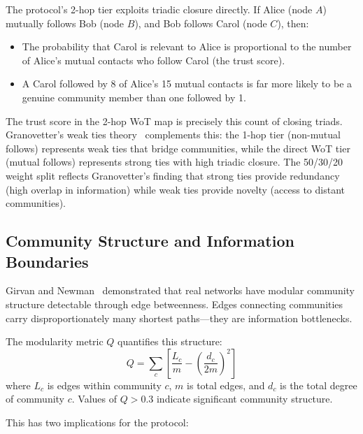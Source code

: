 \documentclass[11pt,a4paper]{article}
\begin{document}
The protocol's 2-hop tier exploits triadic closure directly. If Alice (node $A$) mutually follows Bob (node $B$), and Bob follows Carol (node $C$), then:

\begin{itemize}
  \item The probability that Carol is relevant to Alice is proportional to the number of Alice's mutual contacts who follow Carol (the trust score).
  \item A Carol followed by 8 of Alice's 15 mutual contacts is far more likely to be a genuine community member than one followed by 1.
\end{itemize}

The trust score in the 2-hop WoT map is precisely this count of closing triads. Granovetter's weak ties theory~\cite{granovetter} complements this: the 1-hop tier (non-mutual follows) represents weak ties that bridge communities, while the direct WoT tier (mutual follows) represents strong ties with high triadic closure. The 50/30/20 weight split reflects Granovetter's finding that strong ties provide redundancy (high overlap in information) while weak ties provide novelty (access to distant communities).

\subsection{Community Structure and Information Boundaries}

Girvan and Newman~\cite{girvan-newman} demonstrated that real networks have modular community structure detectable through edge betweenness. Edges connecting communities carry disproportionately many shortest paths---they are information bottlenecks.

The modularity metric $Q$ quantifies this structure:
\begin{equation}
  Q = \sum_c \left[ \frac{L_c}{m} - \left(\frac{d_c}{2m}\right)^2 \right]
\end{equation}
where $L_c$ is edges within community $c$, $m$ is total edges, and $d_c$ is the total degree of community $c$. Values of $Q > 0.3$ indicate significant community structure.

This has two implications for the protocol:
\end{document}
